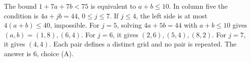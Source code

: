 The bound $1+7a+7b<75$ is equivalent to $a+b\le10$. In column five the condition is $4a+jb=44$, $0\le j\le7$. If $j\le4$, the left side is at most $4(a+b)\le40$, impossible. For $j=5$, solving $4a+5b=44$ with $a+b\le10$ gives $(a,b)=(1,8),(6,4)$. For $j=6$, it gives $(2,6),(5,4),(8,2)$. For $j=7$, it gives $(4,4)$. Each pair defines a distinct grid and no pair is repeated. The answer is $\boxed6$, choice (A).
